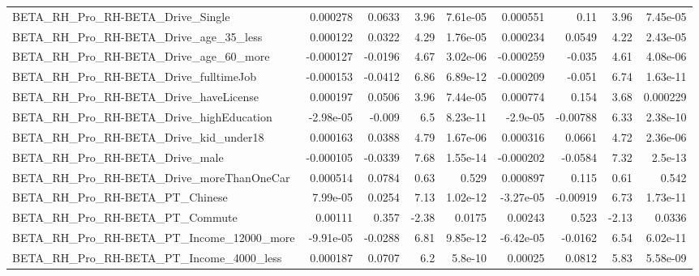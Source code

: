 \begin{tabular}{lrrrrrrrr}
BETA\_RH\_Pro\_RH-BETA\_Drive\_Single                   &    0.000278 &       0.0633 &      3.96 & 7.61e-05 &   0.000551 &        0.11 &         3.96 &      7.45e-05 \\
BETA\_RH\_Pro\_RH-BETA\_Drive\_age\_35\_less              &    0.000122 &       0.0322 &      4.29 & 1.76e-05 &   0.000234 &      0.0549 &         4.22 &      2.43e-05 \\
BETA\_RH\_Pro\_RH-BETA\_Drive\_age\_60\_more              &   -0.000127 &      -0.0196 &      4.67 & 3.02e-06 &  -0.000259 &      -0.035 &         4.61 &      4.08e-06 \\
BETA\_RH\_Pro\_RH-BETA\_Drive\_fulltimeJob              &   -0.000153 &      -0.0412 &      6.86 & 6.89e-12 &  -0.000209 &      -0.051 &         6.74 &      1.63e-11 \\
BETA\_RH\_Pro\_RH-BETA\_Drive\_haveLicense              &    0.000197 &       0.0506 &      3.96 & 7.44e-05 &   0.000774 &       0.154 &         3.68 &      0.000229 \\
BETA\_RH\_Pro\_RH-BETA\_Drive\_highEducation            &   -2.98e-05 &       -0.009 &       6.5 & 8.23e-11 &   -2.9e-05 &    -0.00788 &         6.33 &      2.38e-10 \\
BETA\_RH\_Pro\_RH-BETA\_Drive\_kid\_under18              &    0.000163 &       0.0388 &      4.79 & 1.67e-06 &   0.000316 &      0.0661 &         4.72 &      2.36e-06 \\
BETA\_RH\_Pro\_RH-BETA\_Drive\_male                     &   -0.000105 &      -0.0339 &      7.68 & 1.55e-14 &  -0.000202 &     -0.0584 &         7.32 &       2.5e-13 \\
BETA\_RH\_Pro\_RH-BETA\_Drive\_moreThanOneCar           &    0.000514 &       0.0784 &      0.63 &    0.529 &   0.000897 &       0.115 &         0.61 &         0.542 \\
BETA\_RH\_Pro\_RH-BETA\_PT\_Chinese                     &    7.99e-05 &       0.0254 &      7.13 & 1.02e-12 &  -3.27e-05 &    -0.00919 &         6.73 &      1.73e-11 \\
BETA\_RH\_Pro\_RH-BETA\_PT\_Commute                     &     0.00111 &        0.357 &     -2.38 &   0.0175 &    0.00243 &       0.523 &        -2.13 &        0.0336 \\
BETA\_RH\_Pro\_RH-BETA\_PT\_Income\_12000\_more           &   -9.91e-05 &      -0.0288 &      6.81 & 9.85e-12 &  -6.42e-05 &     -0.0162 &         6.54 &      6.02e-11 \\
BETA\_RH\_Pro\_RH-BETA\_PT\_Income\_4000\_less            &    0.000187 &       0.0707 &       6.2 &  5.8e-10 &    0.00025 &      0.0812 &         5.83 &      5.58e-09 \\

\end{tabular}
